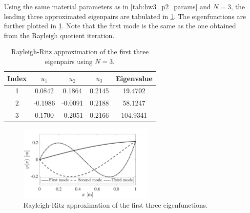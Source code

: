 \begin{enumerate}[(i)]
{    Using the same material parameters as in \cref{tab:hw3_p2_params} and $N = 3$, the leading three approximated eigenpairs are tabulated in \cref{tab:hw3_p2_rr_results}.
    The eigenfunctions are further plotted in \cref{fig:hw3_p2_rr_results}. 
    Note that the first mode is the same as the one obtained from the Rayleigh quotient iteration.
    \begin{table}[!ht]
        \centering
        \begin{tabular}{|c|c|c|c|c|}
            \hline
            Index & $u_1$ & $u_2$ & $u_3$ & Eigenvalue \\
            \hline 
            1 & 0.0842 & 0.1864 & 0.2145 & 19.4702 \\
            \hline 
            2 & -0.1986 & -0.0091 & 0.2188 & 58.1247 \\
            \hline 
            3 & 0.1700 & -0.2051 & 0.2166 & 104.9341 \\
            \hline 
        \end{tabular}
        \caption{Rayleigh-Ritz approximation of the first three eigenpairs using $N = 3$. }
        \label{tab:hw3_p2_rr_results}
    \end{table}
    \begin{figure}[!ht]
        \centering
        \includegraphics[width=0.6\textwidth]{homework/hw3/assets/hw3_p2_rr.pdf}
        \caption{Rayleigh-Ritz approximation of the first three eigenfunctions.}
        \label{fig:hw3_p2_rr_results}
    \end{figure}
}
\end{enumerate}

